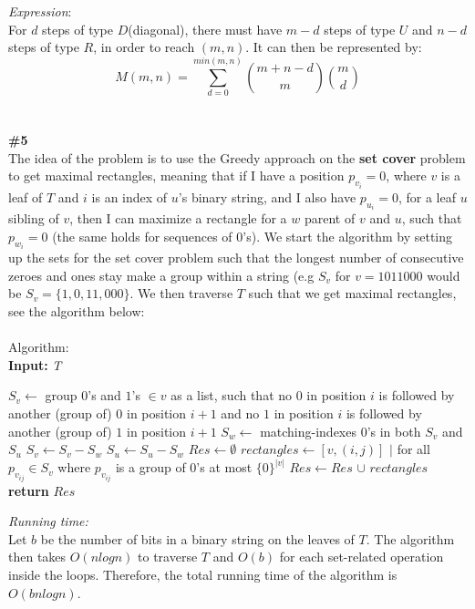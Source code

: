 \documentclass{article}
\newcommand\tab[1][1cm]{\hspace*{#1}}
\begin{document}
\textit{Expression}:\\
For $d$ steps of type $D$(diagonal), there must have $m - d$ steps of type $U$ and $n - d$ steps of type $R$, in order to reach $(m, n)$. It can then be represented by:\\
$$M(m, n) = \sum_{d=0}^{min(m, n)} {m + n - d \choose m} {m \choose d} $$\\\\
\textbf{\#5}\\
The idea of the problem is to use the Greedy approach on the \textbf{set cover} problem to get maximal rectangles, meaning that if I have a position $p_{v_i} = 0$, where $v$ is a leaf of $T$ and $i$ is an index of $u$'s binary string, and I also have $p_{u_i} = 0$, for a leaf $u$ sibling of $v$, then I can maximize a rectangle for a $w$ parent of $v$ and $u$, such that $p_{w_i} = 0$ (the same holds for sequences of $0$'s). We start the algorithm by setting up the sets for the set cover problem such that the longest number of consecutive zeroes and ones stay make a group within a string (e.g $S_v$ for $v = 1011000$ would be $S_v = \{1, 0, 11, 000\}$. We then traverse $T$ such that we get maximal rectangles, see the algorithm below: \\\\
Algorithm:\\
\textbf{Input:} \textit{T}
\begin{algorithmic}
  \State $S_v \gets$ group $0$'s and $1$'s $\in v$ as a list, such that no $0$ in position $i$ is \tab followed by another (group of) $0$ in position $i+1$ and no $1$ in position \tab $i$ is followed by another (group of) $1$ in position $i+1$
\EndFor
{}
  \State $S_w \gets$ matching-indexes $0$'s in both $S_v$ and $S_u$
  \State $S_v \gets S_v - S_w$
  \State $S_u \gets S_u - S_w$ 
\EndFor
\State $Res \gets \emptyset$
    \State $rectangles \gets [v, (i, j)]$ $|$ for all $p_{v_{ij}} \in S_v$ where $p_{v_{ij}}$ is a group of $0$'s at \tab\tab\tab\space\space most $\{0\}^{|v|}$
    \State $Res \gets Res$ $\cup$ $rectangles$
  \EndIf
\EndFor
\State \textbf{return} $Res$\\
\end{algorithmic}
\textit{Running time:}\\
Let $b$ be the number of bits in a binary string on the leaves of $T$. The algorithm then takes $O(nlogn)$ to traverse $T$ and $O(b)$ for each set-related operation inside the loops. Therefore, the total running time of the algorithm is $O(bnlogn)$.
\end{document}
